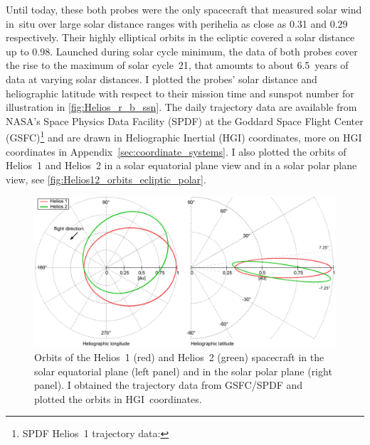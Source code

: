 Until today, these both probes were the only spacecraft that measured solar wind in~situ over large solar distance ranges with perihelia as close as \SI{0.31}{\au} and \SI{0.29}{\au} respectively. Their highly elliptical orbits in the ecliptic covered a solar distance up to \SI{0.98}{\au}. Launched during solar cycle minimum, the data of both probes cover the rise to the maximum of solar cycle~21, that amounts to about 6.5~years of data at varying solar distances. I plotted the probes' solar distance and heliographic latitude with respect to their mission time and sunspot number for illustration in \autoref{fig:Helios_r_b_ssn}. The daily trajectory data are available from NASA's Space Physics Data Facility (SPDF) at the Goddard Space Flight Center (GSFC)\protect\footnote{SPDF Helios~1 trajectory data: } and are drawn in Heliographic Inertial (HGI) coordinates, more on HGI coordinates in Appendix~\ref{sec:coordinate_systems}. I also plotted the orbits of Helios~1 and Helios~2 in a solar equatorial plane view and in a solar polar plane view, see \autoref{fig:Helios12_orbits_ecliptic_polar}.
\begin{figure}[t]
	\centering
	\includegraphics[width=\textwidth]{figures_of_mine/gnuplots/Helios12_orbits_ecliptic_polar.pdf}
	\caption[I created the figure myself.]
	{Orbits of the Helios~1 (red) and Helios~2 (green) spacecraft in the solar equatorial plane (left panel) and in the solar polar plane (right panel). I obtained the trajectory data from GSFC/SPDF and plotted the orbits in HGI~coordinates.}
	\label{fig:Helios12_orbits_ecliptic_polar}
\end{figure}

